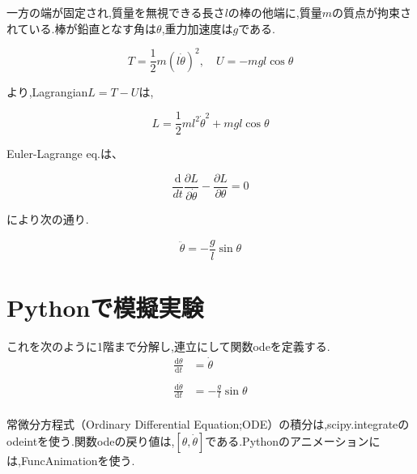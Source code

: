 一方の端が固定され,質量を無視できる長さ$l$の棒の他端に,質量$m$の質点が拘束されている.棒が鉛直となす角は$\theta$,重力加速度は$g$である.

\[
\displaystyle T=\frac{1}{2}m(l\dot{\theta})^2,\quad U=-mgl\cos\theta
\]

より,Lagrangian$L=T-U$は,

\[
\displaystyle L=\frac{1}{2}ml^2\dot{\theta}^2+mgl\cos\theta
\]

Euler-Lagrange eq.は、

\[
\displaystyle\frac{\mathrm{d}}{dt}\frac{\partial L}{\partial \dot{\theta}}-\frac{\partial L}{\partial \theta}=0
\]

により次の通り.

\[
\displaystyle\ddot{\theta}=-\frac{g}{l}\sin\theta
\]

\section{Pythonで模擬実験}

これを次のように1階まで分解し,連立にして関数odeを定義する.\\

\begin{align*}
\displaystyle\frac{\mathrm{d}\theta}{\mathrm{d}t}&=\dot{\theta}\\\\
\displaystyle\frac{\mathrm{d}\dot{\theta}}{\mathrm{d}t}&=-\displaystyle\frac{g}{l}\sin\theta
\end{align*}\\

常微分方程式（Ordinary Differential Equation;ODE）の積分は,scipy.integrateのodeintを使う.関数odeの戻り値は,$[\theta,\dot{\theta}]$である.Pythonのアニメーションには,FuncAnimationを使う.

\lstset{escapechar=@,style=custompy}

